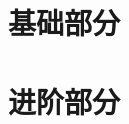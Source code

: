 \documentclass[a4paper,openany]{book}
\begin{document}

\frontmatter

\tableofcontents
\listoftables
\mainmatter
\part{基础部分}






\part{进阶部分}


\end{document}
